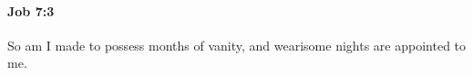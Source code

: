 
		\paragraph{Job 7:3} %
			\label{JOB-7-3}

			So am I made to possess months of vanity, and wearisome nights are appointed to me.


